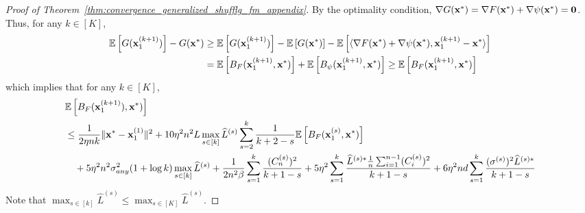 \begin{proof}[Proof of Theorem~\ref{thm:convergence_generalized_shufflg_fm_appendix}]
    By the optimality condition, $\nabla G({\mathbf{x}}^*) = \nabla F({\mathbf{x}}^*) + \nabla \psi({\mathbf{x}}^*) = \mathbf{0}$. Thus, for any $k\in [K]$,
    \begin{align}
        \mathbb{E}\left[G({\mathbf{x}}_1^{(k+1)})\right] - G({\mathbf{x}}^*) 
        &\geq \mathbb{E}\left[ G({\mathbf{x}}_1^{(k+1)})\right] - \mathbb{E}\left[ G({\mathbf{x}}^*)\right] - \mathbb{E}\left[\langle \nabla F({\mathbf{x}}^*) + \nabla \psi({\mathbf{x}}^*), {\mathbf{x}}_1^{(k+1)} - {\mathbf{x}}^* \rangle \right] \\
        &= \mathbb{E}\left[ B_F({\mathbf{x}}_1^{(k+1)},{\mathbf{x}}^*)\right] + \mathbb{E}\left[ B_{\psi}({\mathbf{x}}_1^{(k+1)}, {\mathbf{x}}^*)\right]
        \geq \mathbb{E}\left[ B_F({\mathbf{x}}_1^{(k+1)}, {\mathbf{x}}^*)\right]
    \end{align}
    which implies that for any $k\in [K]$,
    \begin{align}
        &\mathbb{E}\left[B_F({\mathbf{x}}_1^{(k+1)}), {\mathbf{x}}^*)\right]\\
        \nonumber
        &\leq \frac{1}{2\eta n k} \| {\mathbf{x}}^* - {\mathbf{x}}_1^{(1)}\|^2
        + 10 \eta^2 n^2 L\max_{s\in[k]}\widehat{L}^{(s)} \sum_{s=2}^{k} \frac{1}{k+2-s} \mathbb{E}\left[B_F({\mathbf{x}}_1^{(s)}, {\mathbf{x}}^*)\right]\\
        \nonumber
        &\quad + 5\eta^2 n^2 \sigma_{any}^2 (1+\log k) \max_{s\in [k]}\widehat{L}^{(s)}
        + \frac{1}{2n^2 \beta}\sum_{s=1}^{k} \frac{ (C_n^{(s)})^2 }{k+1-s}
        + 5\eta^2 \sum_{s=1}^{k} \frac{ \widehat{L}^{(s)*} \frac{1}{n}\sum_{i=1}^{n-1}(C_i^{(s)})^2} {k+1-s}
        + 6\eta^2 nd \sum_{s=1}^{k} \frac{ (\sigma^{(s)})^2 \widehat{L}^{(s)*} }{k+1-s}
    \end{align}
    Note that $\max_{s\in [k]}\widehat{L}^{(s)} \leq \max_{s\in [K]} \widehat{L}^{(s)}$.
    

\end{proof}
